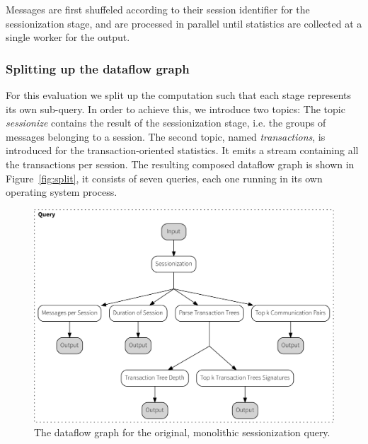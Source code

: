 Messages are first shuffeled according to their session identifier for the
sessionization stage, and are processed in parallel until statistics are
collected at a single worker for the output.

\subsubsection{Splitting up the dataflow graph}

For this evaluation we split up the computation such that each stage represents
its own sub-query. In order to achieve this, we introduce two topics: The topic
\emph{sessionize} contains the result of the sessionization stage, i.e. 
the groups of messages belonging to a session. The second topic, named
\emph{transactions}, is introduced for the transaction-oriented statistics.
It emits a stream containing all the transactions per session. The resulting
composed dataflow graph is shown in Figure~\ref{fig:split}, it consists of
seven queries, each one running in its own operating system process.

\begin{figure}[p]
  \centering
    \includegraphics[width=1\textwidth]{figures/sessionize_dataflow-crop}
  \caption[Dataflow graph for monolithic sessionization]{The dataflow graph
  for the original, monolithic sessionization query.}
  \label{fig:monolith}
\end{figure}

